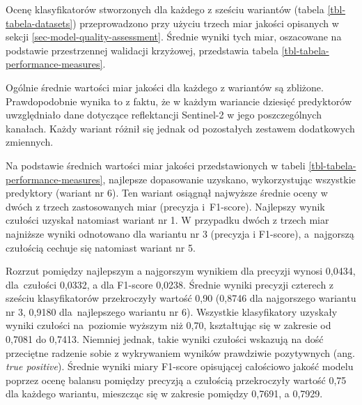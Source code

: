 \documentclass{amuthesis}
\begin{document}
Ocenę klasyfikatorów stworzonych dla każdego z sześciu wariantów (tabela
\ref{tbl-tabela-datasets}) przeprowadzono przy użyciu trzech miar
jakości opisanych w sekcji \ref{sec-model-quality-assessment}. Średnie
wyniki tych miar, oszacowane na podstawie przestrzennej walidacji
krzyżowej, przedstawia tabela \ref{tbl-tabela-performance-measures}.

Ogólnie średnie wartości miar jakości dla każdego z wariantów są
zbliżone. Prawdopodobnie wynika to z faktu, że w każdym wariancie
dziesięć predyktorów uwzględniało dane dotyczące reflektancji Sentinel-2
w jego poszczególnych kanałach. Każdy wariant różnił się jednak od
pozostałych zestawem dodatkowych zmiennych.

Na podstawie średnich wartości miar jakości przedstawionych w tabeli
\ref{tbl-tabela-performance-measures}, najlepsze dopasowanie uzyskano,
wykorzystując wszystkie predyktory (wariant nr 6). Ten wariant osiągnął
najwyższe średnie oceny w dwóch z trzech zastosowanych miar (precyzja
i~F1-score). Najlepszy wynik czułości uzyskał natomiast wariant nr 1. W
przypadku dwóch z trzech miar najniższe wyniki odnotowano dla wariantu
nr 3 (precyzja i F1-score), a~najgorszą czułością cechuje się natomiast
wariant nr 5.

Rozrzut pomiędzy najlepszym a najgorszym wynikiem dla precyzji wynosi
0,0434, dla~czułości 0,0332, a dla F1-score 0,0238. Średnie wyniki
precyzji czterech z sześciu klasyfikatorów przekroczyły wartość 0,90
(0,8746 dla najgorszego wariantu nr 3, 0,9180 dla~najlepszego wariantu
nr 6). Wszystkie klasyfikatory uzyskały wyniki czułości na~poziomie
wyższym niż 0,70, kształtując się w zakresie od 0,7081 do 0,7413.
Niemniej jednak, takie wyniki czułości wskazują na dość przeciętne
radzenie sobie z wykrywaniem wyników prawdziwie pozytywnych (ang.
\emph{true positive}). Średnie wyniki miary F1-score opisującej
całościowo jakość modelu poprzez ocenę balansu pomiędzy precyzją a
czułością przekroczyły wartość 0,75 dla każdego wariantu, mieszcząc się
w zakresie pomiędzy 0,7691, a 0,7929.
\end{document}

